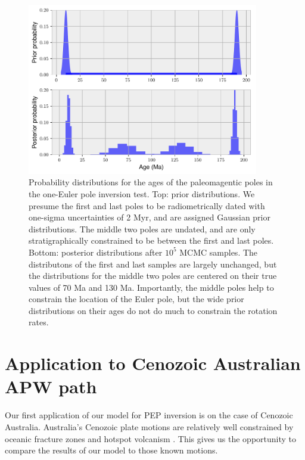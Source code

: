 \documentclass[preprint,12pt,authoryear]{elsarticle}
\begin{document}
\begin{figure}
\includegraphics[width=0.9\textwidth]{figures/synthetic/age_uncertainty_samples.pdf}
\caption[Probability distributions for ages of the paleomagnetic poles in the one-Euler pole inversion test.]{Probability distributions for the ages of the paleomagentic poles in the one-Euler pole inversion test. Top: prior distributions. We presume the first and last poles to be radiometrically dated with one-sigma uncertainties of 2 Myr, and are assigned Gaussian prior distributions. The middle two poles are undated, and are only stratigraphically constrained to be between the first and last poles. Bottom: posterior distributions after $10^5$ MCMC samples. The distributons of the first and last samples are largely unchanged, but the distributions for the middle two poles are centered on their true values of 70 Ma and 130 Ma. Importantly, the middle poles help to constrain the location of the Euler pole, but the wide prior distributions on their ages do not do much to constrain the rotation rates.}
\label{fig:age_uncertainty_samples}
\end{figure}

\section{Application to Cenozoic Australian APW path}
\label{sec:australia}
Our first application of our model for PEP inversion is on the case of Cenozoic Australia.
Australia's Cenozoic plate motions are relatively well constrained by oceanic fracture zones
and hotspot volcanism \citep{muller1993revised, seton2012global}.
This gives us the opportunity to compare the results of our model to those known motions.
\end{document}
